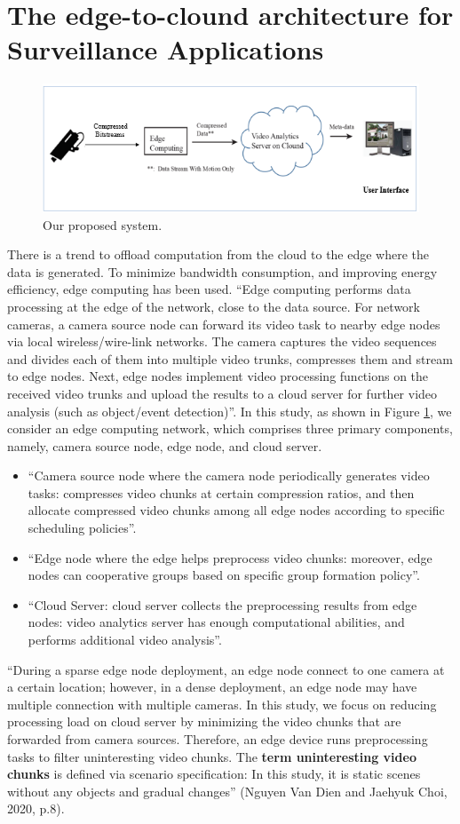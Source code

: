 \section{The edge-to-clound architecture for Surveillance Applications}
\begin{figure}
\centering
 \includegraphics[width=1.0\linewidth]{Figures/arch.png}
 \caption{ Our proposed system.}
 \label{fig:arch}
\end{figure}
There is a trend to offload computation from the cloud to the edge where the data is generated. To minimize bandwidth consumption, and improving energy efficiency, edge computing has been used. “Edge computing performs data processing at the edge of the network, close to the data source. For network cameras, a camera source node can forward its video task to nearby edge nodes via local wireless/wire-link networks. The camera captures the video sequences and divides each of them into multiple video trunks, compresses them and stream to edge nodes. Next, edge nodes implement video processing functions on the received video trunks and upload the results to a cloud server for further video analysis (such as object/event detection)”. In this study, as shown in Figure \ref{fig:arch}, we consider an edge computing network, which comprises three primary components, namely, camera source node, edge node, and cloud server.
\begin{itemize}
\item “Camera source node where the camera node periodically generates video tasks: compresses video chunks at certain compression ratios, and then allocate compressed video chunks among all edge nodes according to specific scheduling policies”.
\item “Edge node where the edge helps preprocess video chunks: moreover, edge nodes can cooperative groups based on specific group formation policy”.
\item “Cloud Server: cloud server collects the preprocessing results from edge nodes: video analytics server has enough computational abilities, and performs additional video analysis”.
\end{itemize}
 “During a sparse edge node deployment, an edge node  connect to one camera  at a certain location; however, in a dense deployment, an edge node may have multiple connection with multiple cameras. In this study, we focus on reducing processing load on cloud server by minimizing the video chunks that are forwarded from camera sources. Therefore, an edge device runs preprocessing tasks to filter uninteresting video chunks. The \textbf{term uninteresting video chunks} is defined via scenario specification: In this study, it is static scenes without any objects and gradual changes” (Nguyen Van Dien and Jaehyuk Choi, 2020, p.8).

